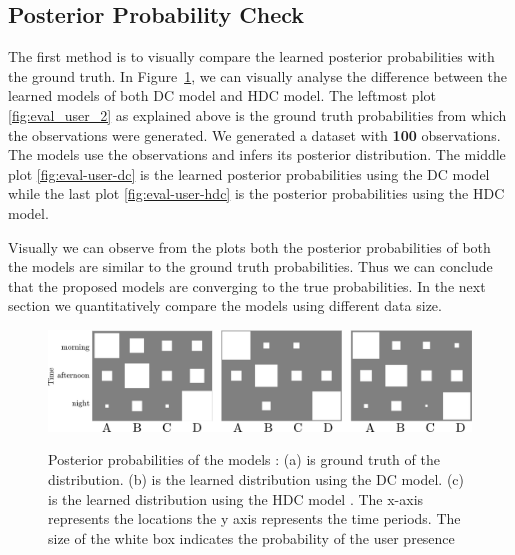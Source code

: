 \subsection{Posterior Probability Check}
The first method is to visually compare the learned posterior probabilities with the ground truth.  In Figure~\ref{fig:eval-user-dc-hdc}, we can visually analyse the difference between the learned models of both DC model and HDC model. The leftmost plot \ref{fig:eval_user_2} as explained above is the ground truth probabilities from which the observations were generated. We generated a dataset with \textbf{100} observations. The models use the observations and infers its posterior distribution. The middle plot \ref{fig:eval-user-dc} is the learned posterior probabilities using the DC model while the last plot \ref{fig:eval-user-hdc} is the posterior probabilities using the HDC model. 

Visually we can observe from the plots both the posterior probabilities of both the models are similar to the ground truth probabilities. Thus we can conclude that the proposed models are converging to the true probabilities. In the next section we quantitatively compare the models using different data size.

\begin{figure}
    \centering
    \includegraphics[width=\textwidth]{images/eval_human_results.png}
       
    \begin{minipage}[t]{.35\textwidth}
    \label{fig:eval_user_2}
    \end{minipage}%
    \begin{minipage}[t]{.3\textwidth}
    \label{fig:eval-user-dc}
    \end{minipage}
    \begin{minipage}[t]{.25\textwidth}
    \label{fig:eval-user-hdc}
    \end{minipage}

\caption[Posterior probabilities of DC and HDC ]{Posterior probabilities of the models : (a) is ground truth of the distribution. (b) is the learned distribution using the DC model. (c) is the learned distribution using the HDC  model . The x-axis represents the locations the y axis represents the time periods. The size of the white box indicates the probability of the user presence }\label{fig:eval-user-dc-hdc}
    
\end{figure}

